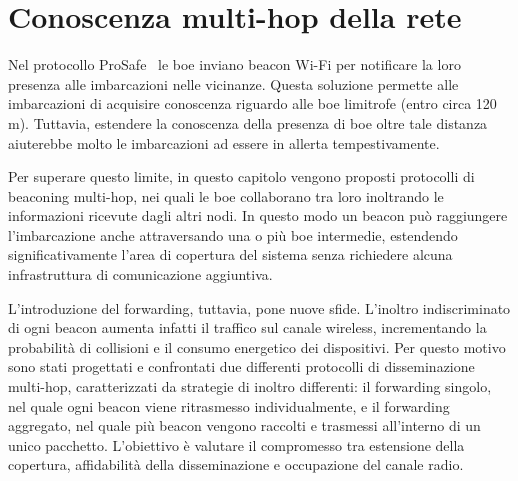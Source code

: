 \chapter{Conoscenza multi-hop della rete}
\label{ch:contributo}

Nel protocollo ProSafe~\cite{prosafe} le boe inviano beacon Wi-Fi per notificare la loro presenza alle imbarcazioni nelle vicinanze.
Questa soluzione permette alle imbarcazioni di acquisire conoscenza riguardo alle boe limitrofe (entro circa 120 m).
Tuttavia, estendere la conoscenza della presenza di boe oltre tale distanza aiuterebbe molto le imbarcazioni ad essere in allerta tempestivamente.

Per superare questo limite, in questo capitolo vengono proposti protocolli di beaconing multi-hop, 
nei quali le boe collaborano tra loro inoltrando le informazioni ricevute dagli altri nodi. 
In questo modo un beacon può raggiungere l'imbarcazione anche attraversando una o più boe intermedie, estendendo significativamente l'area di copertura del sistema 
senza richiedere alcuna infrastruttura di comunicazione aggiuntiva.

L'introduzione del forwarding, tuttavia, pone nuove sfide. L'inoltro indiscriminato di ogni beacon aumenta infatti il traffico sul canale wireless, 
incrementando la probabilità di collisioni e il consumo energetico dei dispositivi. Per questo motivo sono stati progettati e confrontati due differenti 
protocolli di disseminazione multi-hop, caratterizzati da strategie di inoltro differenti: il forwarding singolo, nel quale ogni beacon viene ritrasmesso individualmente, 
e il forwarding aggregato, nel quale più beacon vengono raccolti e trasmessi all'interno di un unico pacchetto. 
L'obiettivo è valutare il compromesso tra estensione della copertura, affidabilità della disseminazione e occupazione del canale radio.

